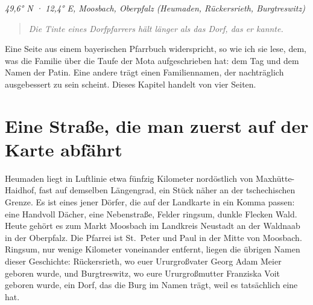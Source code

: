 \documentclass[
  ngerman,
  11pt,
  openany]{book}
\begin{document}
\emph{49,6° N · 12,4° E, Moosbach, Oberpfalz (Heumaden, Rückersrieth,
Burgtreswitz)}

\begin{quote}
\emph{Die Tinte eines Dorfpfarrers hält länger als das Dorf, das er
kannte.}
\end{quote}

Eine Seite aus einem bayerischen Pfarrbuch widerspricht, so wie ich sie
lese, dem, was die Familie über die Taufe der Mota aufgeschrieben hat:
dem Tag und dem Namen der Patin. Eine andere trägt einen Familiennamen,
der nachträglich ausgebessert zu sein scheint. Dieses Kapitel handelt
von vier Seiten.

\section{Eine Straße, die man zuerst auf der Karte
abfährt}\label{eine-strauxdfe-die-man-zuerst-auf-der-karte-abfuxe4hrt}

Heumaden liegt in Luftlinie etwa fünfzig Kilometer nordöstlich von
Maxhütte-Haidhof, fast auf demselben Längengrad, ein Stück näher an der
tschechischen Grenze. Es ist eines jener Dörfer, die auf der Landkarte
in ein Komma passen: eine Handvoll Dächer, eine Nebenstraße, Felder
ringsum, dunkle Flecken Wald. Heute gehört es zum Markt Moosbach im
Landkreis Neustadt an der Waldnaab in der Oberpfalz. Die Pfarrei ist
St.~Peter und Paul in der Mitte von Moosbach. Ringsum, nur wenige
Kilometer voneinander entfernt, liegen die übrigen Namen dieser
Geschichte: Rückersrieth, wo euer Ururgroßvater Georg Adam Meier geboren
wurde, und Burgtreswitz, wo eure Ururgroßmutter Franziska Voit geboren
wurde, ein Dorf, das die Burg im Namen trägt, weil es tatsächlich eine
hat.
\end{document}
